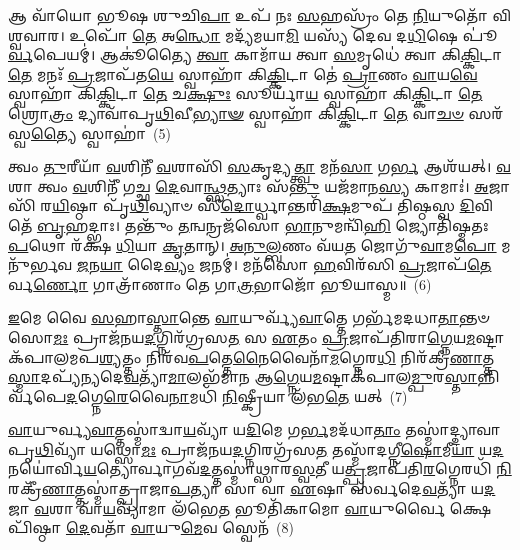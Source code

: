 {\anuvakamend[{\-\ul{𑌵}\-\-\ul{𑌰𑍍𑌤}\-𑌯𑍇𑌤𑍍𑌯𑌾᳴𑌹 \ul{𑌨} 𑌇\-\ul{𑌤𑌿} 𑌵𑍈 𑌨𑌾\-\ul{𑌭𑍍𑌯𑌾} 𑌉𑌲𑍍𑌬᳴\-\ul{𑌮𑌿}\-𑌵𑍈𑌕᳴𑌵𑌿𑍞𑌶𑌤𑌿𑌶𑍍𑌚}]}%

𑌆 𑌵𑌾᳴𑌯𑍋 𑌭𑍂𑌷 𑌶𑍁𑌚𑌿\-\ul{𑌪𑌾} 𑌉𑌪᳴ 𑌨𑌃 \ul{𑌸}\-𑌹𑌸𑍍𑌰𑌂᳴ 𑌤𑍇 \ul{𑌨𑌿}\-𑌯𑍁𑌤𑍋᳴ 𑌵𑌿𑌶𑍍𑌵𑌵𑌾𑌰। 𑌉𑌪𑍋᳴ \ul{𑌤𑍇} 𑌅\-\ul{𑌨𑍍𑌧𑍋} 𑌮𑌦𑍍𑌯᳴𑌮𑌯𑌾\-\ul{𑌮𑌿} 𑌯𑌸𑍍𑌯᳴ 𑌦𑍇𑌵 𑌦\-\ul{𑌧𑌿}\-𑌷𑍇 𑌪𑍂॑\-\ul{𑌰𑍍𑌵}\-𑌪𑍇𑌯𑌮𑍍॑। 𑌆𑌕𑍂॑𑌤𑍍𑌯𑍈 \ul{𑌤𑍍𑌵𑌾} 𑌕𑌾𑌮𑌾᳴𑌯 𑌤𑍍𑌵𑌾 \ul{𑌸}\-𑌮𑍃𑌧𑍇॑ 𑌤𑍍𑌵𑌾 𑌕𑌿\-\ul{𑌕𑍍𑌕𑌿}\-𑌟𑌾 \ul{𑌤𑍇} 𑌮𑌨𑌃᳴ \ul{𑌪𑍍𑌰}\-𑌜𑌾𑌪᳴𑌤\-\ul{𑌯𑍇} 𑌸𑍍𑌵𑌾𑌹𑌾᳴ 𑌕𑌿\-\ul{𑌕𑍍𑌕𑌿}\-𑌟𑌾 𑌤𑍇॑ \ul{𑌪𑍍𑌰𑌾}\-𑌣𑌂 \ul{𑌵𑌾}\-𑌯\-\ul{𑌵𑍇} 𑌸𑍍𑌵𑌾𑌹𑌾᳴ 𑌕𑌿\-\ul{𑌕𑍍𑌕𑌿}\-𑌟𑌾 \ul{𑌤𑍇} 𑌚\-\ul{𑌕𑍍𑌷𑍁𑌃} 𑌸𑍂𑌰𑍍𑌯𑌾᳴\-\ul{𑌯} 𑌸𑍍𑌵𑌾𑌹𑌾᳴ 𑌕𑌿\-\ul{𑌕𑍍𑌕𑌿}\-𑌟𑌾 \ul{𑌤𑍇} 𑌶𑍍𑌰𑍋\-\ul{𑌤𑍍𑌰𑌂} 𑌦𑍍𑌯𑌾𑌵𑌾᳴𑌪𑍃\-\ul{𑌥𑌿}\-𑌵𑍀\-\ul{𑌭𑍍𑌯𑌾}\-\-\ul{𑍟} 𑌸𑍍𑌵𑌾𑌹𑌾᳴ 𑌕𑌿\-\ul{𑌕𑍍𑌕𑌿}\-𑌟𑌾 \ul{𑌤𑍇} 𑌵𑌾\-\ul{𑌚}\-\-\ul{𑍞} 𑌸𑌰᳴𑌸𑍍𑌵\-\ul{𑌤𑍍𑌯𑍈} 𑌸𑍍𑌵𑌾𑌹𑌾॑~(5)

𑌤𑍍𑌵𑌂 \ul{𑌤𑍁}\-𑌰𑍀𑌯𑌾᳴ \ul{𑌵}\-𑌶𑌿𑌨𑍀᳴ \ul{𑌵}\-𑌶𑌾𑌸𑌿᳴ \ul{𑌸}\-𑌕𑍃𑌦𑍍𑌯\-\ul{𑌤𑍍𑌤𑍍𑌵𑌾} 𑌮𑌨᳴\-\ul{𑌸𑌾} 𑌗\-\ul{𑌰𑍍𑌭} 𑌆𑌶᳴𑌯𑌤𑍍। \ul{𑌵}\-𑌶𑌾 𑌤𑍍𑌵𑌂 \ul{𑌵}\-𑌶𑌿𑌨𑍀᳴ 𑌗𑌚𑍍𑌛 \ul{𑌦𑍇}\-𑌵𑌾\-\ul{𑌨𑍍𑌥𑍍𑌸}\-𑌤𑍍𑌯𑌾𑌃 𑌸᳴\-\ul{𑌨𑍍𑌤𑍁} 𑌯𑌜᳴𑌮𑌾𑌨\-\ul{𑌸𑍍𑌯} 𑌕𑌾𑌮𑌾𑌃॑। \ul{𑌅}\-𑌜𑌾𑌸𑌿᳴ 𑌰\-\ul{𑌯𑌿}\-𑌷𑍍𑌠𑌾 𑌪𑍃᳴\-\ul{𑌥𑌿}\-𑌵𑍍𑌯𑌾𑍞 𑌸𑍀᳴\-\ul{𑌦𑍋}\-𑌰𑍍𑌧𑍍𑌵𑌾𑌨𑍍𑌤𑌰𑌿᳴\-\ul{𑌕𑍍𑌷}\-𑌮𑍁𑌪᳴ 𑌤𑌿𑌷𑍍𑌠𑌸𑍍𑌵 \ul{𑌦𑌿}\-𑌵𑌿 𑌤𑍇᳴ \ul{𑌬𑍃}\-𑌹𑌦𑍍𑌭𑌾𑌃। 𑌤𑌨𑍍𑌤𑍁𑌂᳴ \ul{𑌤}\-𑌨𑍍𑌵𑌨𑍍𑌰𑌜᳴𑌸𑍋 \ul{𑌭𑌾}\-𑌨𑍁𑌮𑌨𑍍𑌵𑌿᳴\-\ul{𑌹𑌿} 𑌜𑍍𑌯𑍋𑌤𑌿᳴𑌷𑍍𑌮𑌤𑌃 \ul{𑌪}\-𑌥𑍋 𑌰᳴𑌕𑍍𑌷 \ul{𑌧𑌿}\-𑌯𑌾 \ul{𑌕𑍃}\-𑌤𑌾𑌨𑍍। \ul{𑌅}\-\-\ul{𑌨𑍁}\-\-\ul{𑌲𑍍𑌬}\-𑌣𑌂 𑌵᳴𑌯\-\ul{𑌤} 𑌜𑍋𑌗𑍁᳴\-\ul{𑌵𑌾}\-𑌮\-\ul{𑌪𑍋} 𑌮𑌨𑍁᳴𑌰𑍍𑌭𑌵 \ul{𑌜}\-𑌨\-\ul{𑌯𑌾} 𑌦𑍈\-\ul{𑌵𑍍𑌯𑌂} 𑌜𑌨𑌮𑍍॑। 𑌮𑌨᳴𑌸𑍋 \ul{𑌹}\-𑌵𑌿𑌰᳴𑌸𑌿 \ul{𑌪𑍍𑌰}\-𑌜𑌾𑌪᳴\-\ul{𑌤𑍇}\-𑌰𑍍𑌵\-\ul{𑌰𑍍𑌣𑍋} 𑌗𑌾𑌤𑍍𑌰𑌾᳴𑌣𑌾𑌂 𑌤𑍇 𑌗𑌾\-\ul{𑌤𑍍𑌰}\-𑌭𑌾𑌜𑍋᳴ 𑌭𑍂𑌯𑌾𑌸𑍍𑌮॥~(6)

{\anuvakamend[{𑌸𑌰᳴𑌸𑍍𑌵\-\ul{𑌤𑍍𑌯𑍈} 𑌸𑍍𑌵𑌾\-\ul{𑌹𑌾} 𑌮\-\ul{𑌨𑍁}\-𑌸𑍍𑌤𑍍𑌰𑌯𑍋᳴𑌦𑌶 𑌚}]}%

\-\ul{𑌇}\-𑌮𑍇 𑌵𑍈 \ul{𑌸}\-𑌹𑌾\-\ul{𑌸𑍍𑌤𑌾}\-𑌨𑍍𑌤𑍇 \ul{𑌵𑌾}\-𑌯𑍁𑌰𑍍𑌵𑍍𑌯᳴\-\ul{𑌵𑌾}\-𑌤𑍍𑌤𑍇 𑌗𑌰𑍍𑌭᳴𑌮𑌦𑌧𑌾\-\ul{𑌤𑌾}\-𑌨𑍍𑌤𑍞 𑌸𑍋\-\ul{𑌮𑌃} 𑌪𑍍𑌰𑌾𑌜᳴𑌨𑌯\-\ul{𑌦}\-𑌗𑍍𑌨𑌿𑌰᳴𑌗𑍍𑌰𑌸\-\ul{𑌤} 𑌸 \ul{𑌏}\-𑌤𑌂 \ul{𑌪𑍍𑌰}\-𑌜𑌾𑌪᳴𑌤𑌿𑌰𑌾\-\ul{𑌗𑍍𑌨𑍇}\-𑌯\-\ul{𑌮}\-𑌷𑍍𑌟𑌾𑌕᳴𑌪𑌾𑌲\-𑌮𑌪\-\ul{𑌶𑍍𑌯}\-𑌤𑍍𑌤𑌂 𑌨𑌿𑌰᳴𑌵\-\ul{𑌪}\-𑌤𑍍𑌤𑍇\-\ul{𑌨𑍈}\-𑌵𑍈𑌨𑌾᳴\-\ul{𑌮}\-𑌗𑍍𑌨𑍇𑌰\-\ul{𑌧𑌿} 𑌨𑌿𑌰᳴𑌕𑍍𑌰𑍀\-\ul{𑌣𑌾}\-𑌤𑍍𑌤\-\ul{𑌸𑍍𑌮𑌾}\-𑌦𑌪𑍍𑌯᳴𑌨𑍍𑌯𑌦𑍇\-\ul{𑌵}\-𑌤𑍍𑌯𑌾᳴\-\ul{𑌮𑌾}\-𑌲𑌭᳴𑌮𑌾𑌨 𑌆\-\ul{𑌗𑍍𑌨𑍇}\-𑌯\-\ul{𑌮}\-𑌷𑍍𑌟𑌾𑌕᳴𑌪𑌾𑌲\-\ul{𑌮𑍍𑌪𑍁}\-𑌰\-\ul{𑌸𑍍𑌤𑌾}\-𑌨𑍍𑌨𑌿𑌰𑍍𑌵᳴𑌪𑍇\-\ul{𑌦}\-𑌗𑍍𑌨𑍇\-\-\ul{𑌰𑍇}\-𑌵𑍈\-\ul{𑌨𑌾}\-𑌮𑌧𑌿᳴ \ul{𑌨𑌿}\-𑌷𑍍𑌕𑍍𑌰𑍀𑌯𑌾 𑌲᳴𑌭\-\ul{𑌤𑍇} 𑌯𑌤𑍍~(7)

\-\ul{𑌵𑌾}\-𑌯𑍁𑌰𑍍𑌵𑍍𑌯\-\ul{𑌵𑌾}\-𑌤𑍍𑌤𑌸𑍍𑌮𑌾॑𑌦𑍍𑌵𑌾\-\ul{𑌯}\-𑌵𑍍𑌯𑌾᳴ 𑌯\-\ul{𑌦𑌿}\-𑌮𑍇 𑌗\-\ul{𑌰𑍍𑌭}\-𑌮𑌦᳴𑌧𑌾\-\ul{𑌤𑌾𑌂} 𑌤𑌸𑍍𑌮𑌾॑𑌦𑍍𑌦𑍍𑌯𑌾𑌵𑌾𑌪𑍃\-\ul{𑌥𑌿}\-𑌵𑍍𑌯𑌾᳴ 𑌯𑌥𑍍𑌸𑍋\-\ul{𑌮𑌃} 𑌪𑍍𑌰𑌾𑌜᳴𑌨𑌯\-\ul{𑌦}\-𑌗𑍍𑌨𑌿𑌰𑌗𑍍𑌰᳴𑌸\-\ul{𑌤} 𑌤𑌸𑍍𑌮𑌾᳴𑌦𑌗𑍍𑌨𑍀\-\ul{𑌷𑍋}\-𑌮𑍀\-\ul{𑌯𑌾} 𑌯\-\ul{𑌦}\-𑌨𑌯𑍋॑𑌰𑍍𑌵𑌿\-\ul{𑌯}\-𑌤𑍍𑌯𑍋𑌰𑍍𑌵𑌾𑌗𑌵᳴\-\ul{𑌦}\-𑌤𑍍𑌤𑌸𑍍𑌮𑌾॑𑌥𑍍𑌸𑌾𑌰\-\ul{𑌸𑍍𑌵}\-𑌤𑍀 𑌯\-\ul{𑌤𑍍𑌪𑍍𑌰}\-𑌜𑌾𑌪᳴𑌤𑌿\-\ul{𑌰}\-𑌗𑍍𑌨𑍇𑌰𑌧𑌿᳴ \ul{𑌨𑌿}\-𑌰𑌕𑍍𑌰𑍀᳴\-\ul{𑌣𑌾}\-𑌤𑍍𑌤𑌸𑍍𑌮𑌾॑𑌤𑍍𑌪𑍍𑌰𑌾𑌜𑌾\-\ul{𑌪}\-𑌤𑍍𑌯𑌾 𑌸𑌾 𑌵𑌾 \ul{𑌏}\-𑌷𑌾 𑌸᳴𑌰𑍍𑌵𑌦𑍇\-\ul{𑌵}\-𑌤𑍍𑌯𑌾᳴ 𑌯\-\ul{𑌦}\-𑌜𑌾 \ul{𑌵}\-𑌶𑌾 𑌵𑌾᳴\-\ul{𑌯}\-𑌵𑍍𑌯𑌾᳴𑌮𑌾 𑌲᳴𑌭𑍇\-\ul{𑌤} 𑌭𑍂𑌤𑌿᳴𑌕𑌾𑌮𑍋 \ul{𑌵𑌾}\-𑌯𑍁𑌰𑍍𑌵𑍈 𑌕𑍍𑌷𑍇𑌪𑌿᳴𑌷𑍍𑌠𑌾 \ul{𑌦𑍇}\-𑌵𑌤𑌾᳴ \ul{𑌵𑌾}\-𑌯𑍁\-\ul{𑌮𑍇}\-𑌵 𑌸𑍍𑌵𑍇𑌨᳴~(8)

